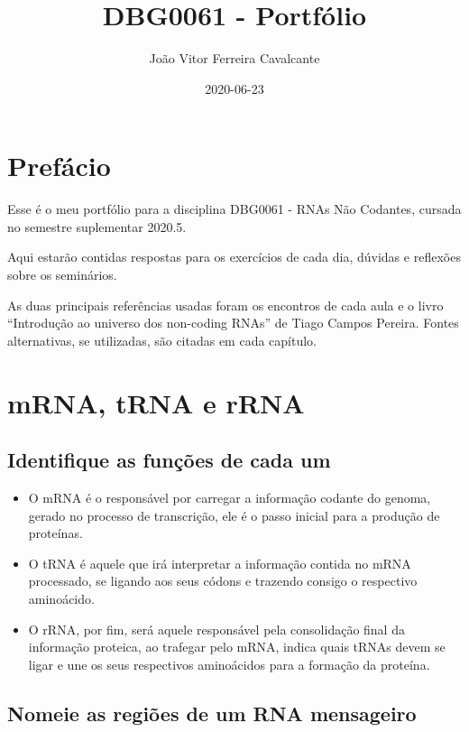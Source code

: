 \documentclass[
]{book}
\title{DBG0061 - Portfólio}
\author{João Vitor Ferreira Cavalcante}
\date{2020-06-23}
\begin{document}
\maketitle

{
\setcounter{tocdepth}{1}
\tableofcontents
}
\hypertarget{prefuxe1cio}{%
\chapter{Prefácio}\label{prefuxe1cio}}

Esse é o meu portfólio para a disciplina DBG0061 - RNAs Não Codantes, cursada no semestre suplementar 2020.5.

Aqui estarão contidas respostas para os exercícios de cada dia, dúvidas e reflexões sobre os seminários.

As duas principais referências usadas foram os encontros de cada aula e o livro ``Introdução ao universo dos non-coding RNAs'' de Tiago Campos Pereira. Fontes alternativas, se utilizadas, são citadas em cada capítulo.

\hypertarget{aula1}{%
\chapter{mRNA, tRNA e rRNA}\label{aula1}}

\hypertarget{identifique-as-funuxe7uxf5es-de-cada-um}{%
\section{Identifique as funções de cada um}\label{identifique-as-funuxe7uxf5es-de-cada-um}}

\begin{itemize}
\item
  O mRNA é o responsável por carregar a informação codante do genoma, gerado no processo de transcrição,
  ele é o passo inicial para a produção de proteínas.
\item
  O tRNA é aquele que irá interpretar a informação contida no mRNA processado, se ligando aos seus códons e trazendo consigo o respectivo aminoácido.
\item
  O rRNA, por fim, será aquele responsável pela consolidação final da informação proteica, ao trafegar pelo mRNA, indica quais tRNAs devem se ligar e une os seus respectivos aminoácidos para a formação da proteína.
\end{itemize}

\hypertarget{regioes}{%
\section{Nomeie as regiões de um RNA mensageiro}\label{regioes}}
\end{document}
